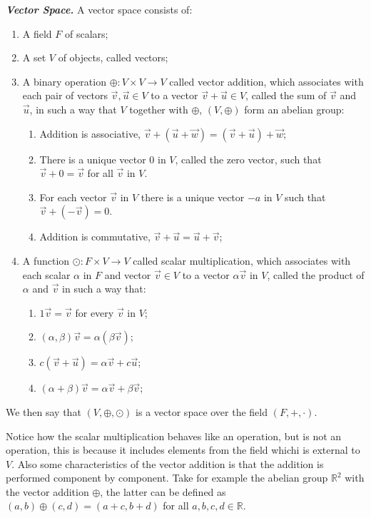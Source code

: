 \documentclass{report}
\begin{document}
    \begin{defBox}
        \textit{\textbf{Vector Space.}} A vector space consists of:

        \begin{enumerate}
            \item A field $F$ of scalars;
            \item A set $V$ of objects, called vectors;
            \item A binary operation $\oplus : V \times V \rightarrow V$ called vector addition, which associates with each pair of vectors $\vec{v} , \vec{u} \in V$ to a vector $\vec{v} + \vec{u} \in V$, called the sum of $\vec{v}$ and $\vec{u}$, in such a way that $V$ together with $\oplus$, $(V, \oplus)$ form an abelian group:

            \begin{enumerate}
                \item Addition is associative, $\vec{v} + (\vec{u} + \vec{w}) = (\vec{v} + \vec{u}) + \vec{w}$;
                \item There is a unique vector $0$ in $V$, called the zero vector, such that $\vec{v} + 0 = \vec{v}$ for all $\vec{v}$ in $V$.
                \item For each vector $\vec{v}$ in $V$ there is a unique vector $-a$ in $V$ such that $\vec{v} + (-\vec{v}) = 0$.
                \item Addition is commutative, $\vec{v} + \vec{u} = \vec{u} + \vec{v}$;
            \end{enumerate}

            \item A function $\odot : F \times V \rightarrow V$ called scalar multiplication, which associates with each scalar $\alpha$ in $F$ and vector $\vec{v} \in V$ to a vector $\alpha\vec{v}$ in $V$, called the product of $\alpha$ and $\vec{v}$ in such a way that:

            \begin{enumerate}
                \item $1\vec{v} = \vec{v}$ for every $\vec{v}$ in $V$;
                \item $(\alpha, \beta)\vec{v} = \alpha(\beta\vec{v})$;
                \item $c(\vec{v} + \vec{u}) = \alpha\vec{v} + c\vec{u}$;
                \item $(\alpha + \beta)\vec{v} = \alpha\vec{v} + \beta\vec{v}$;
            \end{enumerate}
        \end{enumerate}

        We then say that $(V, \oplus, \odot)$ is a vector space over the field $(F, +, \cdot)$.
    \end{defBox}

    Notice how the scalar multiplication behaves like an operation, but is not an operation, this is because it includes elements from the field whichi is external to $V$. Also some characteristics of the vector addition is that the addition is performed component by component. Take for example the abelian group $\mathbb{R}^2$ with the vector addition $\oplus$, the latter can be defined as $(a, b) \oplus (c, d) = (a+c, b+d)$ for all $a,b,c,d \in \mathbb{R}$.
\end{document}

